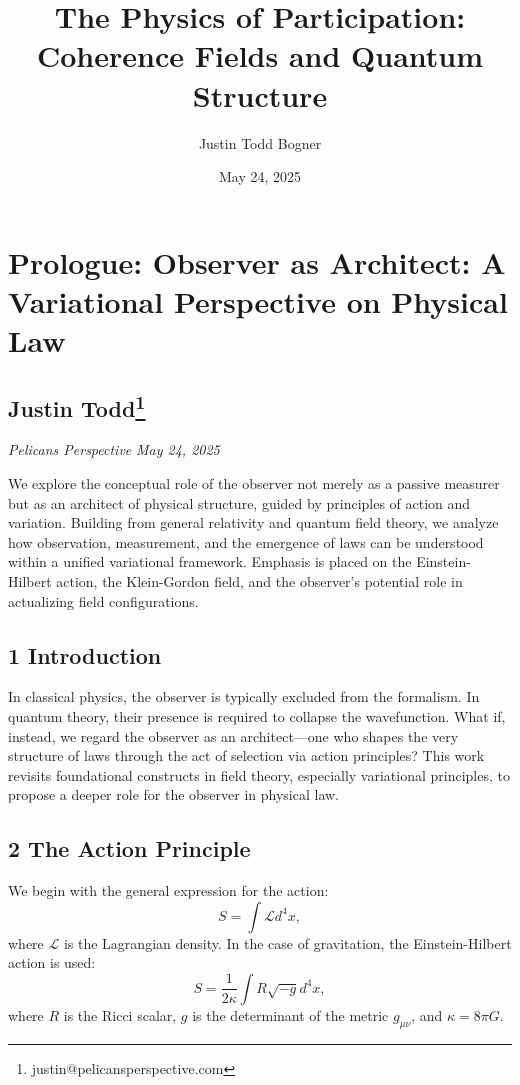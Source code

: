\documentclass{report}
\title{The Physics of Participation: Coherence Fields and Quantum Structure}
\author{Justin Todd Bogner}
\date{May 24, 2025}
\begin{document}
\maketitle
\tableofcontents
\newpage
{} %
\chapter*{Prologue: Observer as Architect: A Variational Perspective on Physical Law}

\section*{Justin Todd\footnote{justin@pelicansperspective.com}}
\textit{Pelicans Perspective}
\textit{May 24, 2025}

We explore the conceptual role of the observer not merely as a passive measurer but as an
architect of physical structure, guided by principles of action and variation. Building from
general relativity and quantum field theory, we analyze how observation, measurement, and
the emergence of laws can be understood within a unified variational framework. Emphasis is
placed on the Einstein-Hilbert action, the Klein-Gordon field, and the observer’s potential role
in actualizing field configurations.

\section*{1 Introduction}
In classical physics, the observer is typically excluded from the formalism. In quantum theory,
their presence is required to collapse the wavefunction. What if, instead, we regard the observer
as an architect—one who shapes the very structure of laws through the act of selection via
action principles? This work revisits foundational constructs in field theory, especially variational
principles, to propose a deeper role for the observer in physical law.

\section*{2 The Action Principle}
We begin with the general expression for the action:
\begin{equation}
S = \int \mathcal{L}d^4x, 
\end{equation}
where $\mathcal{L}$ is the Lagrangian density. In the case of gravitation, the Einstein-Hilbert action is
used:
\begin{equation}
S = \frac{1}{2\kappa} \int R\sqrt{-g}d^4x,
\end{equation}
where $R$ is the Ricci scalar, $g$ is the determinant of the metric $g_{\mu\nu}$, and $\kappa = 8\pi G$.
\end{document}
